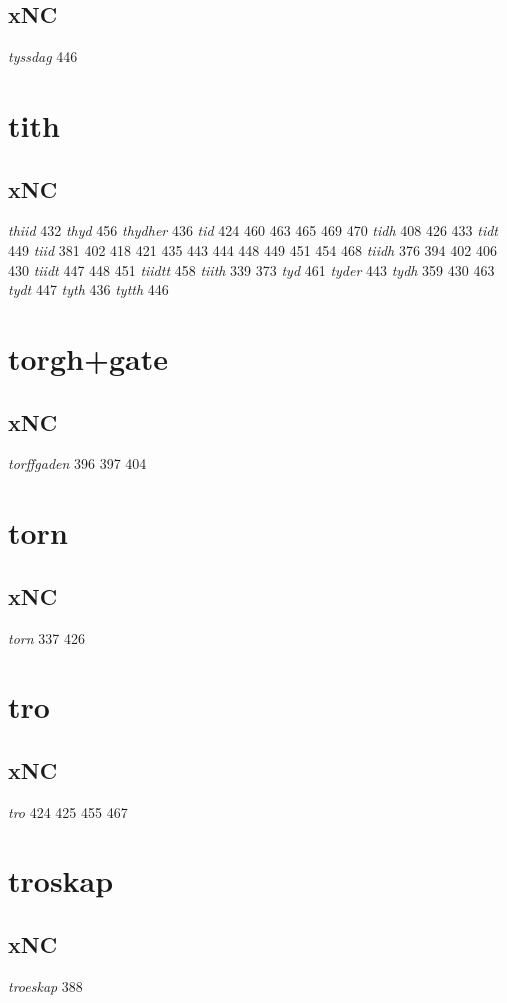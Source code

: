 \documentclass[a4paper,twocolumn]{article}
\begin{document}
\subsection{xNC}
\label{sec:org7b5a985}
\emph{tyssdag} 446 
\section{tith}
\label{sec:org43bb5e5}
\subsection{xNC}
\label{sec:org791c9f6}
\emph{thiid} 432 \emph{thyd} 456 \emph{thydher} 436 \emph{tid} 424 460 463 465 469 470 \emph{tidh} 408 426 433 \emph{tidt} 449 \emph{tiid} 381 402 418 421 435 443 444 448 449 451 454 468 \emph{tiidh} 376 394 402 406 430 \emph{tiidt} 447 448 451 \emph{tiidtt} 458 \emph{tiith} 339 373 \emph{tyd} 461 \emph{tyder} 443 \emph{tydh} 359 430 463 \emph{tydt} 447 \emph{tyth} 436 \emph{tytth} 446 
\section{torgh+gate}
\label{sec:org92c1cc3}
\subsection{xNC}
\label{sec:orgcd03b29}
\emph{torffgaden} 396 397 404 
\section{torn}
\label{sec:org47709b2}
\subsection{xNC}
\label{sec:orgc924719}
\emph{torn} 337 426 
\section{tro}
\label{sec:org680eed2}
\subsection{xNC}
\label{sec:org8343eea}
\emph{tro} 424 425 455 467 
\section{troskap}
\label{sec:org09eb5d8}
\subsection{xNC}
\label{sec:org6c47708}
\emph{troeskap} 388 
\end{document}
